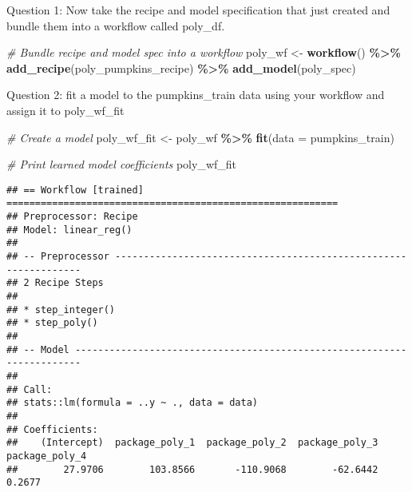 \documentclass[
]{article}
\newenvironment{Shaded}{\begin{snugshade}}{\end{snugshade}}
\newcommand{\AttributeTok}[1]{\textcolor[rgb]{0.13,0.29,0.53}{#1}}
\newcommand{\CommentTok}[1]{\textcolor[rgb]{0.56,0.35,0.01}{\textit{#1}}}
\newcommand{\FunctionTok}[1]{\textcolor[rgb]{0.13,0.29,0.53}{\textbf{#1}}}
\newcommand{\NormalTok}[1]{#1}
\newcommand{\OtherTok}[1]{\textcolor[rgb]{0.56,0.35,0.01}{#1}}
\newcommand{\SpecialCharTok}[1]{\textcolor[rgb]{0.81,0.36,0.00}{\textbf{#1}}}
\begin{document}
Question 1: Now take the recipe and model specification that just
created and bundle them into a workflow called poly\_df.

\begin{Shaded}
\begin{Highlighting}[]
\CommentTok{\# Bundle recipe and model spec into a workflow}
\NormalTok{poly\_wf }\OtherTok{\textless{}{-}} \FunctionTok{workflow}\NormalTok{() }\SpecialCharTok{\%\textgreater{}\%} 
  \FunctionTok{add\_recipe}\NormalTok{(poly\_pumpkins\_recipe) }\SpecialCharTok{\%\textgreater{}\%} 
  \FunctionTok{add\_model}\NormalTok{(poly\_spec)}
\end{Highlighting}
\end{Shaded}

Question 2: fit a model to the pumpkins\_train data using your workflow
and assign it to poly\_wf\_fit

\begin{Shaded}
\begin{Highlighting}[]
\CommentTok{\# Create a model}
\NormalTok{poly\_wf\_fit }\OtherTok{\textless{}{-}}\NormalTok{ poly\_wf }\SpecialCharTok{\%\textgreater{}\%} 
  \FunctionTok{fit}\NormalTok{(}\AttributeTok{data =}\NormalTok{ pumpkins\_train)}
\end{Highlighting}
\end{Shaded}

\begin{Shaded}
\begin{Highlighting}[]
\CommentTok{\# Print learned model coefficients}
\NormalTok{poly\_wf\_fit}
\end{Highlighting}
\end{Shaded}

\begin{verbatim}
## == Workflow [trained] ==========================================================
## Preprocessor: Recipe
## Model: linear_reg()
## 
## -- Preprocessor ----------------------------------------------------------------
## 2 Recipe Steps
## 
## * step_integer()
## * step_poly()
## 
## -- Model -----------------------------------------------------------------------
## 
## Call:
## stats::lm(formula = ..y ~ ., data = data)
## 
## Coefficients:
##    (Intercept)  package_poly_1  package_poly_2  package_poly_3  package_poly_4  
##        27.9706        103.8566       -110.9068        -62.6442          0.2677
\end{verbatim}
\end{document}
